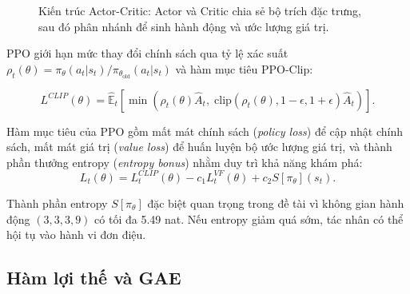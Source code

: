 \begin{figure}[H]
\centering
{}
\caption{Kiến trúc Actor-Critic: Actor và Critic chia sẻ bộ trích đặc trưng, sau đó phân nhánh để sinh hành động và ước lượng giá trị.}
\label{fig:actor_critic}
\end{figure}

PPO giới hạn mức thay đổi chính sách qua tỷ lệ xác suất $\rho_t(\theta) = \pi_\theta(a_t|s_t) / \pi_{\theta_\text{old}}(a_t|s_t)$ và hàm mục tiêu PPO-Clip:

\begin{equation} \label{eq:ppo_clip}
    L^{CLIP}(\theta) =
    \hat{\mathbb{E}}_t
    \left[
    \min
    \left(
    \rho_t(\theta)\hat{A}_t,\;
    \mathrm{clip}(\rho_t(\theta),1-\epsilon,1+\epsilon)\hat{A}_t
    \right)
    \right].
\end{equation}

Hàm mục tiêu của PPO gồm mất mát chính sách (\emph{policy loss}) để cập nhật chính sách, mất mát giá trị (\emph{value loss}) để huấn luyện bộ ước lượng giá trị, và thành phần thưởng entropy (\emph{entropy bonus}) nhằm duy trì khả năng khám phá:
\begin{equation} \label{eq:ppo_total}
    L_t(\theta) = L_t^{CLIP}(\theta) - c_1 L_t^{VF}(\theta) + c_2 S[\pi_\theta](s_t).
\end{equation}

Thành phần entropy $S[\pi_\theta]$ đặc biệt quan trọng trong đề tài vì không gian hành động $(3,3,3,9)$ có tối đa 5.49 nat. Nếu entropy giảm quá sớm, tác nhân có thể hội tụ vào hành vi đơn điệu.

\subsection{Hàm lợi thế và GAE}

